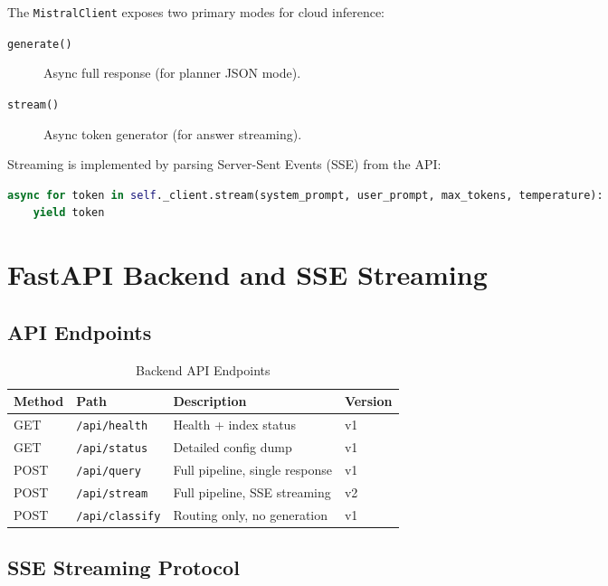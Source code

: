 \documentclass[12pt,a4paper]{report}
\begin{document}
The \texttt{MistralClient} exposes two primary modes for cloud inference:

\begin{description}
  \item[\texttt{generate()}] Async full response (for planner JSON mode).
  \item[\texttt{stream()}] Async token generator (for answer streaming).
\end{description}

Streaming is implemented by parsing Server-Sent Events (SSE) from the API:

\begin{lstlisting}[language=Python, caption={Streaming token extraction}]
async for token in self._client.stream(system_prompt, user_prompt, max_tokens, temperature):
    yield token
\end{lstlisting}

\chapter{FastAPI Backend and SSE Streaming}

\section{API Endpoints}

\begin{table}[H]
\centering
\caption{Backend API Endpoints}
\begin{tabular}{@{}llll@{}}
\toprule
\textbf{Method} & \textbf{Path} & \textbf{Description} & \textbf{Version} \\
\midrule
GET & \texttt{/api/health} & Health + index status & v1 \\
GET & \texttt{/api/status} & Detailed config dump & v1 \\
POST & \texttt{/api/query} & Full pipeline, single response & v1 \\
POST & \texttt{/api/stream} & Full pipeline, SSE streaming & v2 \\
POST & \texttt{/api/classify} & Routing only, no generation & v1 \\
\bottomrule
\end{tabular}
\end{table}

\section{SSE Streaming Protocol}
\end{document}
